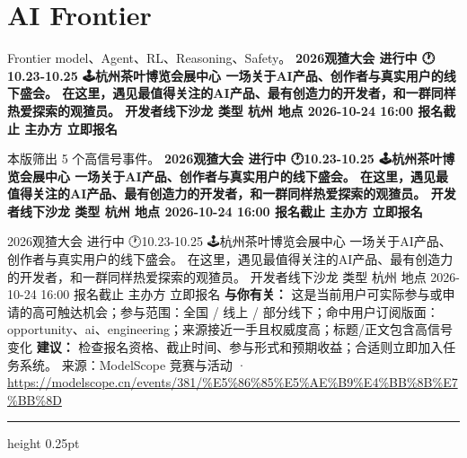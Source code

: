 \documentclass[10.5pt]{ctexart}
\begin{document}
\section*{AI Frontier}
{\color{ormuted} Frontier model、Agent、RL、Reasoning、Safety。}
\vspace{2mm}
{\LARGE\bfseries 2026观猹大会 进行中 🕐10.23-10.25 🕹️杭州茶叶博览会展中心 一场关于AI产品、创作者与真实用户的线下盛会。 在这里，遇见最值得关注的AI产品、最有创造力的开发者，和一群同样热爱探索的观猹员。 开发者线下沙龙 类型 杭州 地点 2026-10-24 16:00 报名截止 主办方 立即报名}\par
\vspace{1mm}
{\color{ormuted} 本版筛出 5 个高信号事件。}
\vspace{3mm}
{\Large\bfseries 2026观猹大会 进行中 🕐10.23-10.25 🕹️杭州茶叶博览会展中心 一场关于AI产品、创作者与真实用户的线下盛会。 在这里，遇见最值得关注的AI产品、最有创造力的开发者，和一群同样热爱探索的观猹员。 开发者线下沙龙 类型 杭州 地点 2026-10-24 16:00 报名截止 主办方 立即报名}\par
2026观猹大会 进行中 🕐10.23-10.25 🕹️杭州茶叶博览会展中心 一场关于AI产品、创作者与真实用户的线下盛会。 在这里，遇见最值得关注的AI产品、最有创造力的开发者，和一群同样热爱探索的观猹员。 开发者线下沙龙 类型 杭州 地点 2026-10-24 16:00 报名截止 主办方 立即报名
\textbf{与你有关：} 这是当前用户可实际参与或申请的高可触达机会；参与范围：全国 / 线上 / 部分线下；命中用户订阅版面：opportunity、ai、engineering；来源接近一手且权威度高；标题/正文包含高信号变化
\textbf{建议：} 检查报名资格、截止时间、参与形式和预期收益；合适则立即加入任务系统。
{\footnotesize\color{ormuted} 来源：ModelScope 竞赛与活动 · \url{https://modelscope.cn/events/381/%E5%86%85%E5%AE%B9%E4%BB%8B%E7%BB%8D}}
\vspace{4mm}
\hrule height 0.25pt
\vspace{3mm}
\end{document}

